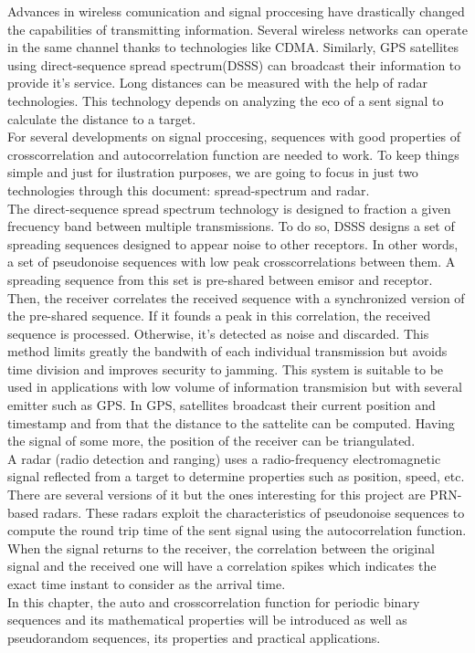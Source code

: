 Advances in wireless comunication and signal proccesing have drastically
changed the capabilities of transmitting information. Several wireless
networks can operate in the same channel thanks to technologies like
CDMA. Similarly, GPS\cite{GPS} satellites using direct-sequence spread
spectrum(DSSS) can broadcast their information to provide it's service. Long
distances can be measured with the help of radar technologies. This
technology depends on analyzing the eco of a sent signal to calculate the
distance to a target.\\

For several developments on signal proccesing, sequences with good properties
of crosscorrelation and autocorrelation function are needed to work. To keep
things simple and just for ilustration purposes, we are going to focus in just
two technologies through this document: spread-spectrum and radar.\\

The direct-sequence spread spectrum technology\cite{DSSS_1}\cite{DSSS} is
designed to fraction a given frecuency band between multiple transmissions. To
do so, DSSS designs a set of spreading sequences designed to appear noise to
other receptors. In other words, a set of pseudonoise sequences with low peak
crosscorrelations between them. A spreading sequence from this set is pre-shared
between emisor and receptor. Then, the receiver correlates the received
sequence with a synchronized version of the pre-shared sequence. If it founds a
peak in this correlation, the received sequence is processed. Otherwise, it's
detected as noise and discarded. This method limits greatly the bandwith of
each individual transmission but avoids time division and improves security to
jamming. This system is suitable to be used in applications with low volume
of information transmision but with several emitter such as GPS. In GPS,
satellites broadcast their current position and timestamp and from that
the distance to the sattelite can be computed. Having the signal of some more,
the position of the receiver can be triangulated.\\

A radar (radio detection and ranging) uses a radio-frequency electromagnetic
signal reflected from a target to determine properties such as position, speed,
etc. There are several versions of it but the ones interesting for this
project are PRN-based radars\cite{prn_radar_example1}\cite{prn_radar_example2}.
These radars exploit the characteristics of pseudonoise sequences to compute the
round trip time of the sent signal using the autocorrelation function. When
the signal returns to the receiver, the correlation between the original
signal and the received one will have a correlation spikes which indicates
the exact time instant to consider as the arrival time.\\

In this chapter, the auto and crosscorrelation function for
periodic binary sequences and its mathematical properties will be introduced
as well as pseudorandom sequences, its properties and practical applications.

 
